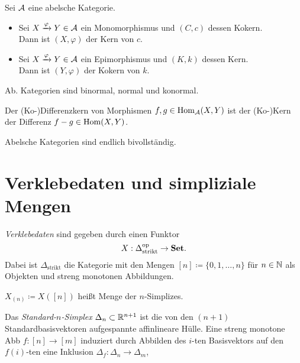 \documentclass{cheat-sheet}
\begin{document}
\begin{lem}
  Sei $\mathcal{A}$ eine abelsche Kategorie.
  \begin{itemize}
    \item Sei $X \xrightarrow{\varphi} Y \in \mathcal{A}$ ein Monomorphismus und $(C, c)$ dessen Kokern. \\
    Dann ist $(X, \varphi)$ der Kern von $c$.
    \item Sei $X \xrightarrow{\varphi} Y \in \mathcal{A}$ ein Epimorphismus und $(K, k)$ dessen Kern. \\
    Dann ist $(Y, \varphi)$ der Kokern von $k$.
  \end{itemize}
\end{lem}

\begin{kor}
  Ab. Kategorien sind binormal, \dh{} normal und konormal.
\end{kor}

\begin{bem}
  Der (Ko-)Differenzkern von Morphismen $f, g \in \operatorname{Hom}_{\mathcal{A}}(X, Y)$ ist der (Ko-)Kern der Differenz $f - g \in \operatorname{Hom}(X, Y)$.
\end{bem}

\begin{kor}
  Abelsche Kategorien sind endlich bivollständig.
\end{kor}



\section{Verklebedaten und simpliziale Mengen}


\begin{defn}
  \emph{Verklebedaten} sind gegeben durch einen Funktor
  \[ X : \Delta_{\text{strikt}}^{\mathrm{op}} \to \mathbf{Set}. \]
  Dabei ist $\Delta_{\text{strikt}}$ die Kategorie mit den Mengen
  $[n] \coloneqq \{ 0, 1, \ldots, n \}$ für $n \in \mathbb{N}$ als Objekten und streng monotonen Abbildungen.
\end{defn}

\begin{nota}
  $X_{(n)} \coloneqq X([n])$ heißt Menge der $n$-Simplizes.
\end{nota}

\begin{defn}
  Das \emph{Standard-$n$-Simplex} $\Delta_n \subset \mathbb{R}^{n+1}$ ist die von den $(n{+}1)$ Standardbasisvektoren aufgespannte affinlineare Hülle. Eine streng monotone Abb $f : [n] \to [m]$ induziert durch Abbilden des $i$-ten Basisvektors auf den $f(i)$-ten eine Inklusion $\Delta_f : \Delta_n \to \Delta_m$,
\end{defn}
\end{document}
